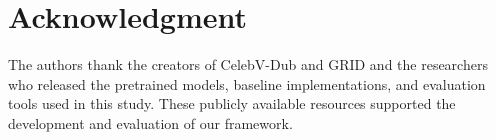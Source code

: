 \section*{Acknowledgment}

The authors thank the creators of CelebV-Dub and GRID and the researchers who released the pretrained models, baseline implementations, and evaluation tools used in this study. These publicly available resources supported the development and evaluation of our framework.
